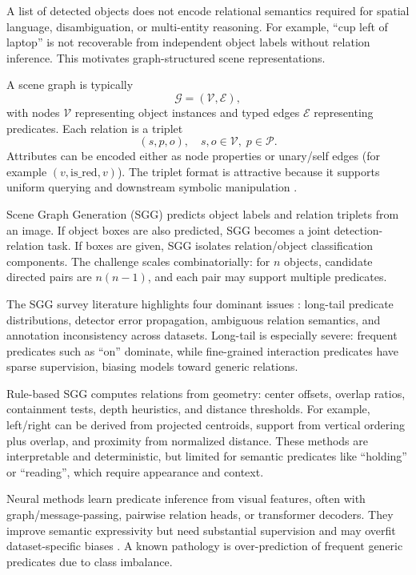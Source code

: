     A list of detected objects does not encode relational semantics required for spatial language, disambiguation, or multi-entity reasoning. For example, \enquote{cup left of laptop} is not recoverable
  from independent object labels without relation inference. This motivates graph-structured scene representations.

    A scene graph is typically
  \[
  \mathcal{G}=(\mathcal{V},\mathcal{E}),
  \]
  with nodes \(\mathcal{V}\) representing object instances and typed edges \(\mathcal{E}\) representing predicates. Each relation is a triplet
  \[
  (s,p,o),\quad s,o\in\mathcal{V},\; p\in\mathcal{P}.
  \]
  Attributes can be encoded either as node properties or unary/self edges (for example \((v,\text{is\_red},v)\)). The triplet format is attractive because it supports uniform querying and downstream
  symbolic manipulation \cite{johnson_image_2015}.

    Scene Graph Generation (SGG) predicts object labels and relation triplets from an image. If object boxes are also predicted, SGG becomes a joint detection-relation task. If boxes are given, SGG
  isolates relation/object classification components. The challenge scales combinatorially: for \(n\) objects, candidate directed pairs are \(n(n-1)\), and each pair may support multiple predicates.

    The SGG survey literature highlights four dominant issues \cite{zhu_scene_2022}: long-tail predicate distributions, detector error propagation, ambiguous relation semantics, and annotation
  inconsistency across datasets. Long-tail is especially severe: frequent predicates such as \enquote{on} dominate, while fine-grained interaction predicates have sparse supervision, biasing models
  toward generic relations.

    Rule-based SGG computes relations from geometry: center offsets, overlap ratios, containment tests, depth heuristics, and distance thresholds. For example, left/right can be derived from projected
  centroids, support from vertical ordering plus overlap, and proximity from normalized distance. These methods are interpretable and deterministic, but limited for semantic predicates like
  \enquote{holding} or \enquote{reading}, which require appearance and context.

    Neural methods learn predicate inference from visual features, often with graph/message-passing, pairwise relation heads, or transformer decoders. They improve semantic expressivity but need
  substantial supervision and may overfit dataset-specific biases \cite{zhu_scene_2022}. A known pathology is over-prediction of frequent generic predicates due to class imbalance.

